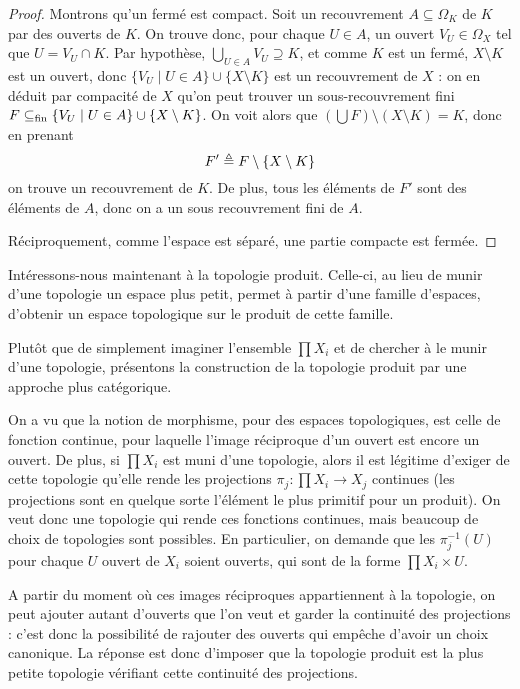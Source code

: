 \begin{proof}
  Montrons qu'un fermé est compact. Soit un recouvrement
  $A\subseteq\Omega_K$ de $K$ par des ouverts de $K$. On trouve donc, pour
  chaque $U\in A$, un ouvert $V_U\in\Omega_X$ tel que $U = V_U\cap K$. Par
  hypothèse, $\displaystyle\bigcup_{U \in A} V_U \supseteq K$, et comme
  $K$ est un fermé, $X\setminus K$ est un ouvert, donc
  $\{V_U\mid U \in A\}\cup\{X\setminus K\}$ est un recouvrement de $X$ :
  on en déduit par compacité de $X$ qu'on peut trouver un sous-recouvrement
  fini $F\subseteq_{\mathrm{fin}} \{V_U\mid U \in A\}\cup\{X\setminus K\}$. On voit alors que
  $(\bigcup F)\setminus (X\setminus K)= K$, donc en prenant
  \[F' \triangleq F\setminus\{X\setminus K\}\]
  on trouve un recouvrement de $K$. De plus, tous les éléments de $F'$ sont
  des éléments de $A$, donc on a un sous recouvrement fini de $A$.

  Réciproquement, comme l'espace est séparé, une partie compacte est fermée.
\end{proof}

Intéressons-nous maintenant à la topologie produit. Celle-ci, au lieu de
munir d'une topologie un espace plus petit, permet à partir d'une famille
d'espaces, d'obtenir un espace topologique sur le produit de cette famille.

Plutôt que de simplement imaginer l'ensemble $\prod X_i$ et de chercher à le
munir d'une topologie, présentons la construction de la topologie produit par
une approche plus catégorique.

On a vu que la notion de morphisme, pour des espaces topologiques, est celle de
fonction continue, pour laquelle l'image réciproque d'un ouvert est encore un
ouvert. De plus, si $\prod X_i$ est muni d'une topologie, alors il est légitime
d'exiger de cette topologie qu'elle rende les projections
$\pi_j : \prod X_i \to X_j$ continues (les projections sont en quelque sorte
l'élément le plus primitif pour un produit). On veut donc une topologie qui
rende ces fonctions continues, mais beaucoup de choix de topologies sont
possibles. En particulier, on demande que les $\pi_j^{-1}(U)$ pour chaque
$U$ ouvert de $X_i$ soient ouverts, qui sont de la forme $\prod X_i \times U$.

A partir du moment où ces images réciproques appartiennent à la topologie, on
peut ajouter autant d'ouverts que l'on veut et garder la continuité des
projections : c'est donc la possibilité de rajouter des ouverts qui empêche
d'avoir un choix canonique. La réponse est donc d'imposer que la topologie
produit est la plus petite topologie vérifiant cette continuité des projections.

